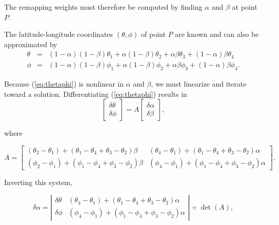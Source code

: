 \begin{description}
     The remapping weights must therefore be computed by finding $\alpha$ and
     $\beta$ at point $P$.  

     The latitude-longitude coordinates $(\theta,\phi)$ of point $P$ are known
     and can also be approximated by
\begin{eqnarray}\label{eq:thetaphi}
\theta & = & (1-\alpha)(1-\beta)\theta_1 + \alpha(1-\beta)\theta_2 + \nonumber
          \alpha\beta \theta_3 + (1-\alpha)\beta \theta_4 \\
\phi   & = & (1-\alpha)(1-\beta)\phi_1   + \alpha(1-\beta)\phi_2 +
          \alpha\beta \phi_3 + (1-\alpha)\beta \phi_4.
\end{eqnarray}

     Because (\ref{eq:thetaphi}) is nonlinear in $\alpha$ and $\beta$, we must
     linearize and iterate toward a solution.  Differentiating 
     (\ref{eq:thetaphi}) results in
\begin{equation}
\left[\begin{array}{c} \delta\theta \\ \delta\phi \end{array}\right] = A
\left[\begin{array}{c} \delta\alpha \\ \delta\beta \end{array}\right],
\end{equation}

     where

\begin{equation}
A = \left[\begin{array}{cc}
(\theta_2-\theta_1) + (\theta_1-\theta_4+\theta_3-\theta_2)\beta &
(\theta_4-\theta_1) + (\theta_1-\theta_4+\theta_3-\theta_2)\alpha \\
(\phi_2-\phi_1) + (\phi_1-\phi_4+\phi_3-\phi_2)\beta &
(\phi_4-\phi_1) + (\phi_1-\phi_4+\phi_3-\phi_2)\alpha
\end{array}\right].
\end{equation}

     Inverting this system,

\begin{equation}\label{eq:dalpha}
\delta\alpha = \left|\begin{array}{cc}
\delta\theta &
(\theta_4-\theta_1) + (\theta_1-\theta_4+\theta_3-\theta_2)\alpha \\
\delta\phi &
(\phi_4-\phi_1) + (\phi_1-\phi_4+\phi_3-\phi_2)\alpha 
\end{array}\right| \div \det(A),
\end{equation}


\end{description}
